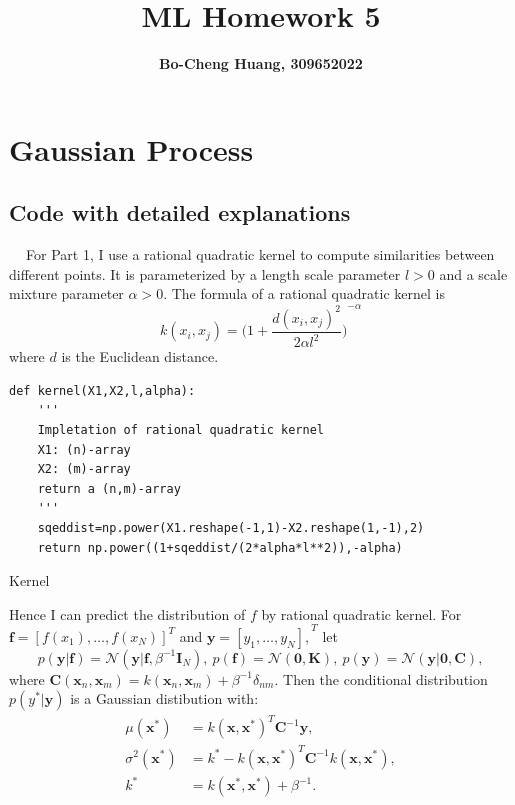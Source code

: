 \documentclass{article}
\begin{document}
 

\title{\bf ML Homework 5}
\author{\bf Bo-Cheng Huang, 309652022}
\date{}

\maketitle


\section{Gaussian Process}

\subsection{Code with detailed explanations}

$\quad\ $For Part 1, I use a rational quadratic kernel to compute similarities between different points. It is parameterized by a length scale parameter $l > 0$ and a scale mixture parameter $\alpha > 0$. The formula of a rational quadratic kernel is 
\[
k(x_i,x_j)={\bigg(1+\frac{d(x_i,x_j)^2}{2 \alpha l^2}\bigg)}^{-\alpha}
\]
where $d$ is the Euclidean distance.

\begin{listing}[!ht]
\begin{verbatim}
def kernel(X1,X2,l,alpha):
    '''
    Impletation of rational quadratic kernel
    X1: (n)-array
    X2: (m)-array
    return a (n,m)-array
    ''' 
    sqeddist=np.power(X1.reshape(-1,1)-X2.reshape(1,-1),2)
    return np.power((1+sqeddist/(2*alpha*l**2)),-alpha)
\end{verbatim}
\caption{Kernel}
\label{listing}
\end{listing}

Hence I can predict the distribution of $f$ by rational quadratic kernel. For $\mathbf{f}={[f(x_1),\dots,f(x_N)]}^T$ and $\mathbf{y}={[y_1,\dots,y_N],}^T$ let
\[
p(\mathbf{y}|\mathbf{f})=\mathcal{N}(\mathbf{y}|\mathbf{f},\beta^{-1}\mathbf{I}_N),\ p(\mathbf{f})=\mathcal{N}(\mathbf{0}, \mathbf{K}),\ p(\mathbf{y})=\mathcal{N}(\mathbf{y}|\mathbf{0}, \mathbf{C}),
\]
where $\mathbf{C}(\mathbf{x}_n,\mathbf{x}_m)=k(\mathbf{x}_n,\mathbf{x}_m)+\beta^{-1}\delta_{nm}$. Then the conditional distribution $p(y^*|\mathbf{y})$ is a Gaussian distibution with:
\begin{align*}
\mu(\mathbf{x}^*)&={k(\mathbf{x},\mathbf{x}^*)}^T\mathbf{C}^{-1}\mathbf{y},\\
\sigma^2(\mathbf{x}^*)&=k^*-{k(\mathbf{x},\mathbf{x}^*)}^T\mathbf{C}^{-1}k(\mathbf{x},\mathbf{x}^*),\\
k^*&=k(\mathbf{x}^*,\mathbf{x}^*)+\beta^{-1}.
\end{align*}
\end{document}
